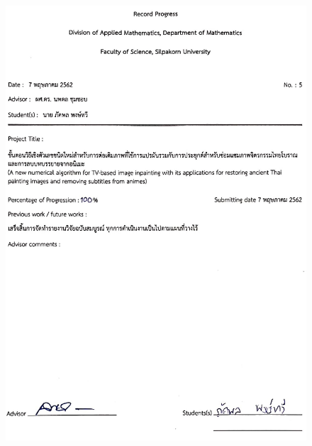 \begin{figure}
    \includegraphics[width=\linewidth]{image/approval_letter/report_05.jpg}
\end{figure}
\clearpage